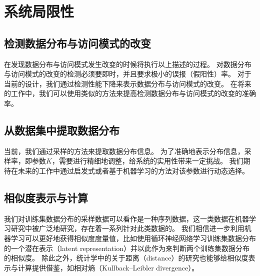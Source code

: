 \section{系统局限性}

\subsection{检测数据分布与访问模式的改变}

{\sys}在发现数据分布与访问模式发生改变的时候将执行以上描述的过程。
对数据分布与访问模式的改变的检测必须要即时，并且要求极小的误报（假阳性）率。
对于当前的设计，我们通过检测性能下降来表示数据分布与访问模式的改变。
在将来的工作中，我们可以使用类似\cite{kang2017noscope}的方法来提高检测数据分布与访问模式的改变的准确率。


\subsection{从数据集中提取数据分布}
当前，我们通过采样的方法来提取数据分布信息。
为了准确地表示分布信息，采样率，即参数$K$，需要进行精细地调整，给系统的实用性带来一定挑战。
我们期待在未来的工作中通过启发式或者基于机器学习的方法对该参数进行动态选择。


\subsection{相似度表示与计算}
我们对训练集数据分布的采样数据可以看作是一种序列数据，这一类数据在机器学习研究中被广泛地研究，存在着一系列针对此类数据的{\model}\cite{krizhevsky2012imagenet, szegedy2015going, simonyan2014very}。
我们相信进一步利用机器学习可以更好地获得相似度度量值，比如使用循环神经网络学习训练集数据分布的一个潜在表示（latent representation）并以此作为{\model}来判断两个训练集数据分布的相似度。
除此之外，统计学中的关于距离（distance）的研究也能够给相似度表示与计算提供借鉴，如相对熵（Kullback–Leibler divergence）。

